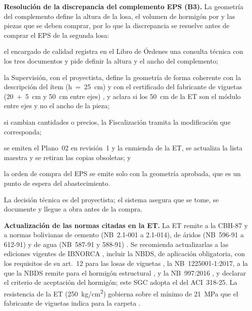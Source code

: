 \textbf{Resolución de la discrepancia del complemento EPS (B3).} La geometría del complemento define la altura de la losa, el volumen de hormigón por \mdos{} y las piezas que se deben comprar, por lo que la discrepancia se resuelve antes de comprar el EPS de la segunda losa:
\begin{enumerate*}[label=(\arabic*)]
  \item el encargado de calidad registra en el Libro de Órdenes una consulta técnica con los tres documentos y pide definir la altura y el ancho del complemento;
  \item la Supervisión, con el proyectista, define la geometría de forma coherente con la descripción del ítem (h~=~25~cm) y con el certificado del fabricante de viguetas (20~+~5~cm y 50~cm entre ejes) \parencite{pretensa2025}, y aclara si los 50~cm de la ET son el módulo entre ejes y no el ancho de la pieza;
  \item si cambian cantidades o precios, la Fiscalización tramita la modificación que corresponda;
  \item se emiten el Plano~02 en revisión~1 y la enmienda de la ET, se actualiza la lista maestra y se retiran las copias obsoletas; y
  \item la orden de compra del EPS se emite solo con la geometría aprobada, que es un punto de espera del abastecimiento.
\end{enumerate*}
La decisión técnica es del proyectista; el sistema asegura que se tome, se documente y llegue a obra antes de la compra.

\textbf{Actualización de las normas citadas en la ET.} La ET remite a la CBH-87 y a normas bolivianas de cemento (NB~2.1-001 a 2.1-014), de áridos (NB~596-91 a 612-91) y de agua (NB~587-91 y 588-91) \parencite[pp.~1--2]{uatf_et}. Se recomienda actualizarlas a las ediciones vigentes de IBNORCA , incluir la NBDS, de aplicación obligatoria, con los requisitos de su art.~12 para las losas de viguetas \parencite[p.~22]{mopsv2023nbds}, la NB~1225001-1:2017, a la que la NBDS remite para el hormigón estructural \parencite{nb1225001_2017}, y la NB~997:2016 \parencite{nb997_2016}, y declarar el criterio de aceptación del hormigón; este SGC adopta el del ACI~318-25. La resistencia de la ET (250~kg/cm\textsuperscript{2}) gobierna sobre el mínimo de 21~MPa que el fabricante de viguetas indica para la carpeta \parencite{pretensa2025}.

